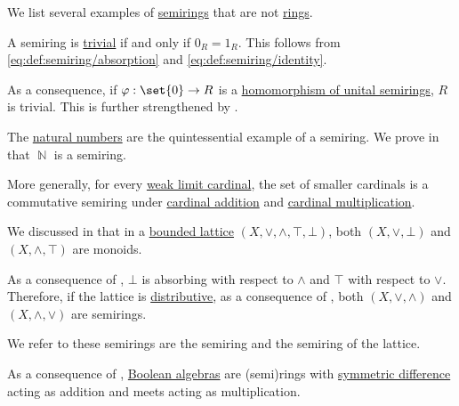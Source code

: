 \begin{example}\label{ex:def:semiring}
  We list several examples of \hyperref[def:semiring]{semirings} that are not \hyperref[def:ring]{rings}.

  \begin{thmenum}
     A semiring is \hyperref[def:semiring/trivial]{trivial} if and only if \( 0_R = 1_R \). This follows from \eqref{eq:def:semiring/absorption} and \eqref{eq:def:semiring/identity}.

    As a consequence, if \( \varphi: \set{ 0 } \to R \) is a \hyperref[def:semiring/homomorphism]{homomorphism of unital semirings}, \( R \) is trivial. This is further strengthened by .

     The \hyperref[def:natural_numbers]{natural numbers} are the quintessential example of a semiring. We prove in  that \( \BbbN \) is a semiring.

     More generally, for every \hyperref[def:successor_and_limit_cardinal/weak_limit]{weak limit cardinal}, the set of smaller cardinals is a commutative semiring under \hyperref[def:cardinal_arithmetic/addition]{cardinal addition} and \hyperref[def:cardinal_arithmetic/multiplication]{cardinal multiplication}.

     We discussed in  that in a \hyperref[def:extremal_points/bounds]{bounded lattice} \( (X, \vee, \wedge, \top, \bot) \), both \( (X, \vee, \bot) \) and \( (X, \wedge, \top) \) are monoids.

    As a consequence of , \( \bot \) is absorbing with respect to \( \wedge \) and \( \top \) with respect to \( \vee \). Therefore, if the lattice is \hyperref[def:distributive_lattice]{distributive}, as a consequence of , both \( (X, \vee, \wedge) \) and \( (X, \wedge, \vee) \) are semirings.

    We refer to these semirings are the  semiring and the  semiring of the lattice.

     As a consequence of , \hyperref[def:boolean_algebra]{Boolean algebras} are (semi)rings with \hyperref[def:symmetric_difference]{symmetric difference} acting as addition and meets acting as multiplication.


\end{thmenum}
\end{example}
